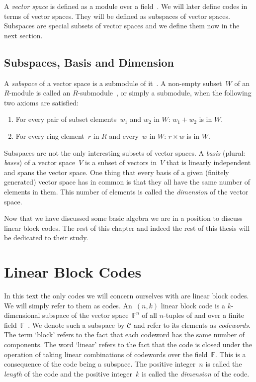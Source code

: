 A \emph{vector space} is defined as a module over a field~\cite[p.~193]{mac99}.
We will later define codes in terms of vector spaces.
They will be defined as subspaces of vector spaces.
Subspaces are special subsets of vector spaces and we define them now in the next section.

\subsection{Subspaces, Basis and Dimension}
A \emph{subspace} of a vector space is a submodule of it~\cite[p.~78]{mil02}. 
A non-empty subset~$W$ of an $R$-module is called an $R$-submodule~\cite[p.~78]{mil02}, or simply a submodule, when the following two axioms are satisfied:
\begin{enumerate}
	\item For every pair of subset elements~$w_1$ and $w_2$ in $W$: $w_1 + w_2$ is in $W$.
	\item For every ring element~$r$ in $R$ and every~$w$ in $W$: $r \times w$ is in $W$.
\end{enumerate}

Subspaces are not the only interesting subsets of vector spaces.
A \emph{basis} (plural: \emph{bases}) of a vector space~$V$ is a subset of vectors in~$V$ that is linearly independent and spans the vector space.
One thing that every basis of a given (finitely generated) vector space has in common is that they all have the same number of elements in them.
This number of elements is called the \emph{dimension} of the vector space.

Now that we have discussed some basic algebra we are in a position to discuss linear block codes.
The rest of this chapter and indeed the rest of this thesis will be dedicated to their study.

\section{Linear Block Codes}
\label{sect:linearblockcodes}
In this text the only codes we will concern ourselves with are linear block codes.
We will simply refer to them as codes.
An~$(n,k)$ linear block code is a $k$-dimensional subspace of the vector space~$\mathbb{F}^n$ of all $n$-tuples of and over a finite field~$\mathbb{F}$~\cite[p.~3]{huf03}.
We denote such a subspace by $\mathcal{C}$ and refer to its elements as \emph{codewords}.
The term `block' refers to the fact that each codeword has the same number of components.
The word `linear' refers to the fact that the code is closed under the operation of taking linear combinations of codewords over the field~$\mathbb{F}$.
This is a consequence of the code being a subspace.
The positive integer~$n$ is called the \emph{length} of the code and the positive integer~$k$ is called the \emph{dimension} of the code.

